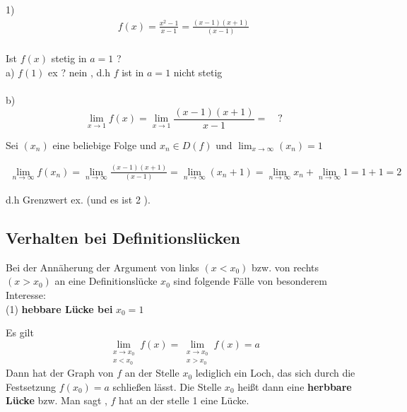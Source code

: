 \begin{example}
\begin{itemize}
1)
\begin{align*}
f(x) = \frac{x^2 - 1}{x - 1} =   
\frac{(x-1)(x+1)}{(x-1)}\\ 
\end{align*}

Ist $f(x)$ stetig in $a = 1$ ?\\

a) \quad $f(1)$ ex ? nein , d.h $f$ ist in $a = 1$ nicht stetig\\ 
\\
b) $$ \lim_{x \to 1}f(x) = \lim_{x \to 1}{\frac{(x-1)(x+1)}{x-1}} = \quad ? $$

Sei $(x_n)$ eine beliebige Folge und $x_n \in D(f)$ und $\lim_{x\to \infty}(x_n)=1$
\end{itemize}
\begin{gather*}
\lim_{n \to \infty }{f(x_n)} = \lim_{n \to \infty }
{\frac{(x-1)(x+1)}{(x-1)}} = \lim_{n \to \infty }{(x_n + 1) } = \lim_{n \to \infty }{x_n} + \lim_{n \to \infty }{1} = 1 + 1 = 2 
\end{gather*}

d.h Grenzwert ex. (und es ist 2 ).
\newpage
\subsection{Verhalten bei Definitionslücken}
Bei der Annäherung der Argument von links $(x < x_0)$ bzw. von rechts $(x > x_0)$ an eine Definitionslücke $x_0$ sind folgende Fälle von besonderem Interesse:\\
(1) \textbf{hebbare Lücke bei} $x_0 = 1$\\
\begin{center}
\end{center}

Es gilt $$\lim_{\substack{x \to x_0 \\ x < x_0}}{f(x)} = \lim_{\substack{x \to x_0 \\ x > x_0}}{f(x) = a}$$
Dann hat der Graph von $f$ an der Stelle $x_0$ lediglich ein Loch, das sich durch die Festsetzung $f(x_0) = a $ schließen lässt. Die Stelle $x_0$ heißt dann eine \textbf{herbbare Lücke} bzw. 
Man sagt , $f$ hat an der stelle 1 eine Lücke.
\end{example}

